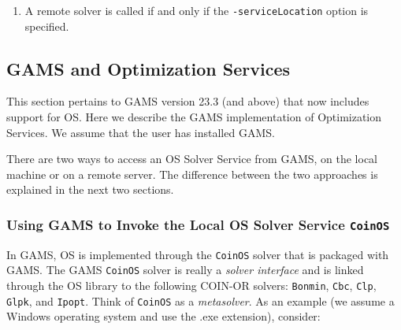 \documentclass[11pt]{article}
\renewcommand{\_}{{\char"5F}}
\renewcommand{\{}{{\char"7B}}
\renewcommand{\}}{{\char"7D}}
\renewcommand{\^}{{\char"0D}}
\renewcommand{\'}{{\char"0D}}
\begin{document}
\begin{enumerate}[Step 1:]
\begin{enumerate}
\item A remote solver is called if and only if the {\tt -serviceLocation} option is specified.

\end{enumerate}




\subsection{GAMS and Optimization Services}\label{section:gamslinks}


This section pertains to GAMS version 23.3 (and above) that now includes support for OS.  
Here we describe the GAMS  implementation of Optimization Services.  We assume that the user has installed GAMS.

There are two ways to access an OS Solver Service from GAMS, on the local machine or on a remote server.
The difference between the two approaches is explained in the next two sections.

\subsubsection{Using GAMS to Invoke the Local OS Solver Service \tt CoinOS}\label{section:gamslocal}

   
In GAMS,  OS is implemented through the {\tt CoinOS} solver that is packaged with GAMS.      
The GAMS {\tt CoinOS} solver is really a {\it solver interface} and is linked through the OS library to the 
following COIN-OR solvers: {\tt Bonmin}, {\tt Cbc}, {\tt Clp},  {\tt Glpk}, and {\tt Ipopt}. 
Think of {\tt CoinOS} as a {\it metasolver}.    As an example (we assume a Windows operating system 
and use the .exe extension), consider:


\end{enumerate}
\end{document}
